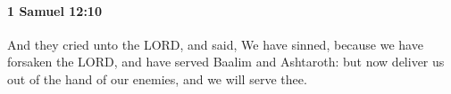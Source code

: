 
		\paragraph{1 Samuel 12:10} %
			\label{1SAMUEL-12-10}

			And they cried unto the LORD, and said, We have sinned, because we have forsaken the LORD, and have served Baalim and Ashtaroth: but now deliver us out of the hand of our enemies, and we will serve thee.


